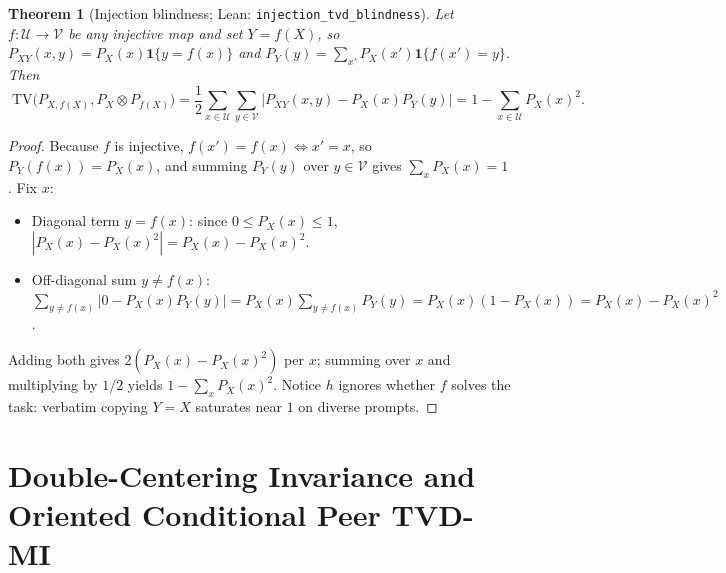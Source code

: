 \documentclass[11pt]{article}
\theoremstyle{plain}
\newtheorem{theorem}{Theorem}[section]
\theoremstyle{definition}
\theoremstyle{remark}
\newcommand{\tvd}{\mathrm{TV}}
\begin{document}
\begin{theorem}[Injection blindness; Lean: \texttt{injection\_tvd\_blindness}]
\label{thm:inj}
Let $f : \mathcal{U} \to \mathcal{V}$ be any injective map and set $Y = f(X)$,
so $P_{XY}(x,y) = P_X(x)\mathbf{1}\{y = f(x)\}$ and $P_Y(y) = \sum_{x'} P_X(x')\mathbf{1}\{f(x') = y\}$.
Then
\begin{equation}
\boxed{\;
\tvd\!\big(P_{X,f(X)}, P_X \otimes P_{f(X)}\big)
= \frac{1}{2}\sum_{x\in\mathcal{U}}\sum_{y\in\mathcal{V}} \big|P_{XY}(x,y) - P_X(x)P_Y(y)\big|
= 1 - \sum_{x\in\mathcal{U}} P_X(x)^2.\;}
\end{equation}
\end{theorem}
\begin{proof}
Because $f$ is injective, $f(x') = f(x) \iff x' = x$, so $P_Y(f(x)) = P_X(x)$,
and summing $P_Y(y)$ over $y \in \mathcal{V}$ gives $\sum_x P_X(x) = 1$. Fix $x$:
\begin{itemize}[leftmargin=*,itemsep=2pt]
  \item Diagonal term $y = f(x)$: since $0 \le P_X(x) \le 1$, $|P_X(x) - P_X(x)^2| = P_X(x) - P_X(x)^2$.
  \item Off-diagonal sum $y \neq f(x)$: $\sum_{y \neq f(x)} |0 - P_X(x)P_Y(y)| = P_X(x)\sum_{y \neq f(x)} P_Y(y) = P_X(x)(1 - P_X(x)) = P_X(x) - P_X(x)^2$.
\end{itemize}
Adding both gives $2(P_X(x) - P_X(x)^2)$ per $x$; summing over $x$ and multiplying by $1/2$ yields
$1 - \sum_x P_X(x)^2$. Notice $h$ ignores whether $f$ solves the task: verbatim
copying $Y=X$ saturates near $1$ on diverse prompts.
\end{proof}

\section{Double-Centering Invariance and Oriented Conditional Peer TVD-MI}
\end{document}
